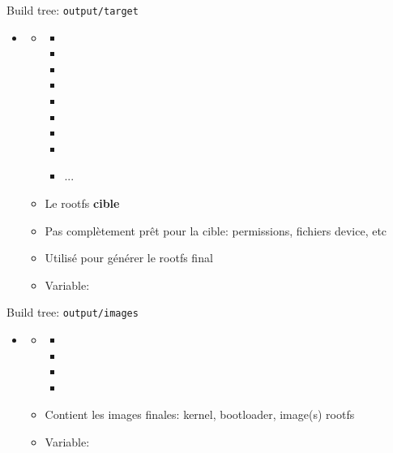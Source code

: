 \documentclass[aspectratio=169,obeyspaces,spaces,hyphens,dvipsnames]{beamer}
\begin{document}
\begin{frame}{Build tree: {\tt output/target}}
  \begin{itemize}
  \item {}
    \begin{itemize}
    \item {}
      \begin{itemize}
        \tiny
      \item {}
      \item {}
      \item {}
      \item {}
      \item {}
      \item {}
      \item {}
      \item {}
      \item ...
      \end{itemize}
    \item Le rootfs \textbf{cible}
    \item Pas complètement prêt pour la cible: permissions, fichiers device, etc
    \item Utilisé pour générer le rootfs final 
    \item Variable: 
    \end{itemize}
  \end{itemize}
\end{frame}

\begin{frame}{Build tree: {\tt output/images}}
  \begin{itemize}
  \item {}
    \begin{itemize}
    \item {}
      \begin{itemize}
        \scriptsize
      \item {}
      \item {}
      \item {}
      \item {}
      \end{itemize}
    \item Contient les images finales: kernel, bootloader, image(s) rootfs
    \item Variable: 
    \end{itemize}
  \end{itemize}
\end{frame}
\end{document}
